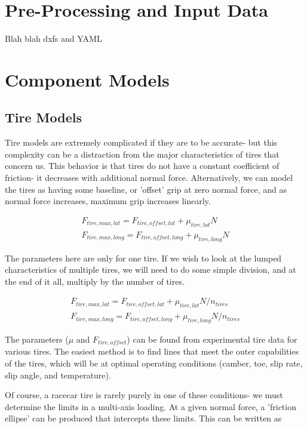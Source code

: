\documentclass{article}
\begin{document}
\section{Pre-Processing and Input Data}
Blah blah dxfs and YAML

\section{Component Models}

\subsection{Tire Models}

Tire models are extremely complicated if they are to be accurate- but this complexity can be a distraction from the major characteristics of tires that concern us. This behavior is that tires do not have a constant coefficient of friction- it decreases with additional normal force. Alternatively, we can model the tires as having some baseline, or 'offset' grip at zero normal force, and as normal force increases, maximum grip increases linearly.

\begin{align}
	F_{tire,max,lat} = F_{tire,offset,lat} + \mu_{tire,lat} N \\
	F_{tire,max,long} = F_{tire,offset,long} + \mu_{tire,long} N
\end{align}

The parameters here are only for one tire. If we wish to look at the lumped characteristics of multiple tires, we will need to do some simple division, and at the end of it all, multiply by the number of tires.

\begin{align}
	F_{tire,max,lat} = F_{tire,offset,lat} + \mu_{tire,lat} N/n_{tires} \\
	F_{tire,max,long} = F_{tire,offset,long} + \mu_{tire,long} N/n_{tires}
\end{align}

The parameters ($\mu$ and $F_{tire,offset}$) can be found from experimental tire data for various tires. The easiest method is to find lines that meet the outer capabilities of the tires, which will be at optimal operating conditions (camber, toe, slip rate, slip angle, and temperature).

Of course, a racecar tire is rarely purely in one of these conditions- we must determine the limits in a multi-axis loading. At a given normal force, a 'friction ellipse' can be produced that intercepts these limits. This can be written as
\end{document}
